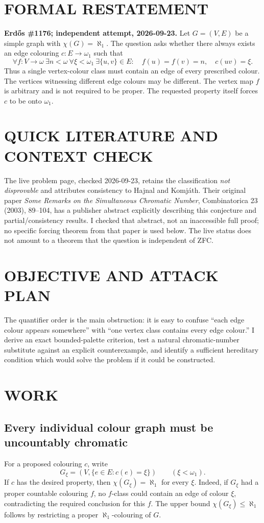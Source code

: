 \section{FORMAL RESTATEMENT}
\textbf{Erd\H{o}s \#1176; independent attempt, 2026-09-23.}
Let $G=(V,E)$ be a simple graph with $\chi(G)=\aleph_1$. The question asks whether there always exists an edge colouring $c:E\to\omega_1$ such that
\[
\forall f:V\to\omega\ \exists n<\omega\ \forall\xi<\omega_1\
\exists\{u,v\}\in E:\quad f(u)=f(v)=n,\quad c(uv)=\xi.
\]
Thus a single vertex-colour class must contain an edge of every prescribed colour. The vertices witnessing different edge colours may be different. The vertex map $f$ is arbitrary and is not required to be proper. The requested property itself forces $c$ to be onto $\omega_1$.

\section{QUICK LITERATURE AND CONTEXT CHECK}
The live problem page, checked 2026-09-23, retains the classification \emph{not disprovable} and attributes consistency to Hajnal and Komj\'ath. Their original paper \emph{Some Remarks on the Simultaneous Chromatic Number}, Combinatorica 23 (2003), 89--104, has a publisher abstract explicitly describing this conjecture and partial/consistency results. I checked that abstract, not an inaccessible full proof; no specific forcing theorem from that paper is used below. The live status does not amount to a theorem that the question is independent of ZFC.

\section{OBJECTIVE AND ATTACK PLAN}
The quantifier order is the main obstruction: it is easy to confuse ``each edge colour appears somewhere'' with ``one vertex class contains every edge colour.'' I derive an exact bounded-palette criterion, test a natural chromatic-number substitute against an explicit counterexample, and identify a sufficient hereditary condition which would solve the problem if it could be constructed.

\section{WORK}
\subsection{Every individual colour graph must be uncountably chromatic}
For a proposed colouring $c$, write
\[
G_\xi=(V,\{e\in E:c(e)=\xi\})\qquad(\xi<\omega_1).
\]
If $c$ has the desired property, then $\chi(G_\xi)=\aleph_1$ for every $\xi$. Indeed, if $G_\xi$ had a proper countable colouring $f$, no $f$-class could contain an edge of colour $\xi$, contradicting the required conclusion for this $f$. The upper bound $\chi(G_\xi)\le\aleph_1$ follows by restricting a proper $\aleph_1$-colouring of $G$.

